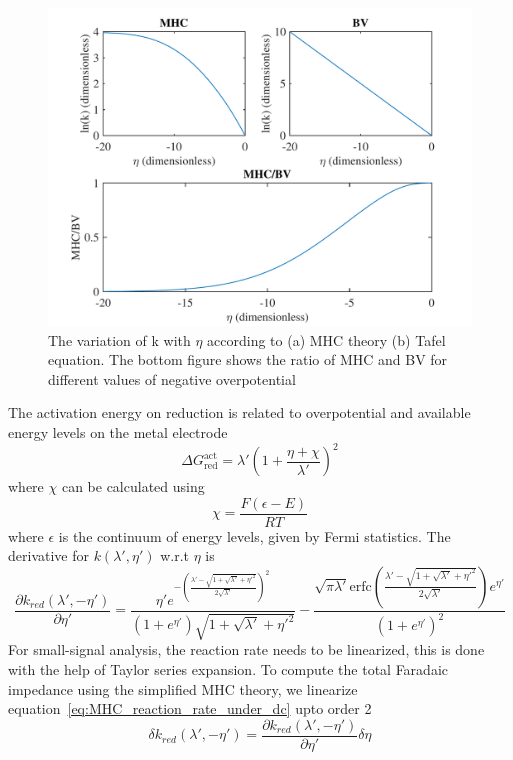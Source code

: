 \documentclass[12pt]{book}
\begin{document}
\begin{figure}[bt]
\centering
\includegraphics[width=0.7\linewidth]{figures/BV_vs_MHC}
\caption{The variation of k with $\eta$ according to (a) MHC theory (b) Tafel equation. The bottom figure shows the ratio of MHC and BV for different values of negative overpotential}
\label{fig:BV_vs_MHC}
\end{figure}
The activation energy on reduction is related to overpotential and available energy levels on the metal electrode
\begin{equation}
\Delta G_\textrm{red}^\textrm{act} = \lambda'\left(1+\frac{\eta+\chi}{\lambda'}\right)^2 \label{eq:relating_eta_gibbs_free_energy}
\end{equation}
where $\chi$ can be calculated using
\begin{equation}
\chi = \frac{F\left(\epsilon -E \right)}{RT}
\end{equation}
where $\epsilon$ is the continuum of energy levels, given by Fermi statistics.
The derivative for $k\left(\lambda',\eta'\right)$ w.r.t $\eta$ is 
\begin{equation}
\frac{\partial k_{red}\left(\lambda',-\eta'\right)}{\partial\eta'} = \frac{\eta'e^{-\left(\frac{\lambda'-\sqrt{1+\sqrt{\lambda'}+\eta'^{2}}}{2\sqrt{\lambda'}}\right)^{2}}} {\left(1+e^{\eta'}\right)\sqrt{1+\sqrt{\lambda'}+\eta'^{2}}} - \frac{\sqrt{\pi\lambda'}\textrm{erfc}\left(\frac{\lambda'-\sqrt{1+\sqrt{\lambda'}+\eta'^{2}}}{2\sqrt{\lambda'}}\right)e^{\eta'}} {\left(1+e^{\eta'}\right)^{2}}
\end{equation}
For small-signal analysis, the reaction rate needs to be linearized, this is done with the help of Taylor series expansion. To compute the total Faradaic impedance using the simplified MHC theory, we linearize equation~\ref{eq:MHC_reaction_rate_under_dc} upto
order 2
\begin{equation}
\delta k_{red}\left(\lambda',-\eta'\right)=\frac{\partial k_{red}\left(\lambda',-\eta'\right)}{\partial\eta'}\delta\eta
\end{equation}
\end{document}
